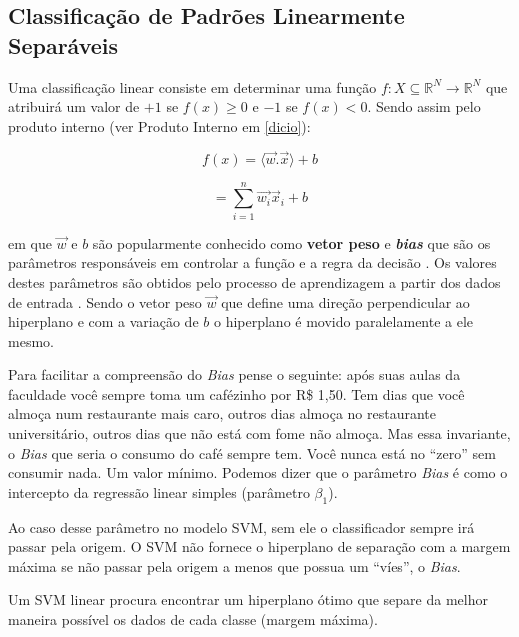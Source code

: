 \documentclass[
  openany]{book}
\begin{document}
\hypertarget{classificauxe7uxe3o-de-padruxf5es-linearmente-separuxe1veis}{%
\subsection{Classificação de Padrões Linearmente Separáveis}\label{classificauxe7uxe3o-de-padruxf5es-linearmente-separuxe1veis}}

Uma classificação linear consiste em determinar uma função \(f: X \subseteq \mathbb{R}^N \rightarrow \mathbb{R}^N\) que atribuirá um valor de \(+1\) se \(f(x)\geq 0\) e \(-1\) se \(f(x)<0\). Sendo assim pelo produto interno (ver Produto Interno em \ref{dicio}):

\begin{equation}
f(x)= \langle\vec{w}.\vec{x}\rangle+b
\label{eq:classlin}
\end{equation}

\begin{equation}
= \displaystyle \sum^n_{i=1} \vec{w_i} \vec{x}_i+b
\label{eq:classlin2}
\end{equation}

em que \(\vec{w}\) e \(b\) são popularmente conhecido como \textbf{vetor peso} e \textbf{\emph{bias}} que são os parâmetros responsáveis em controlar a função e a regra da decisão \citep{lima2002maquinas}. Os valores destes parâmetros são obtidos pelo processo de aprendizagem a partir dos dados de entrada \citep{gonccalves2015maquina}. Sendo o vetor peso \(\vec{w}\) que define uma direção perpendicular ao hiperplano e com a variação de \(b\) o hiperplano é movido paralelamente a ele mesmo.

Para facilitar a compreensão do \emph{Bias} pense o seguinte: após suas aulas da faculdade você sempre toma um cafézinho por R\$ 1,50. Tem dias que você almoça num restaurante mais caro, outros dias almoça no restaurante universitário, outros dias que não está com fome não almoça. Mas essa invariante, o \emph{Bias} que seria o consumo do café sempre tem. Você nunca está no ``zero'' sem consumir nada. Um valor mínimo. Podemos dizer que o parâmetro \emph{Bias} é como o intercepto da regressão linear simples (parâmetro \(\beta_1\)).

Ao caso desse parâmetro no modelo SVM, sem ele o classificador sempre irá passar pela origem. O SVM não fornece o hiperplano de separação com a margem máxima se não passar pela origem a menos que possua um ``víes'', o \emph{Bias}.

Um SVM linear procura encontrar um hiperplano ótimo que separe da melhor maneira possível os dados de cada classe (margem máxima).
\end{document}
